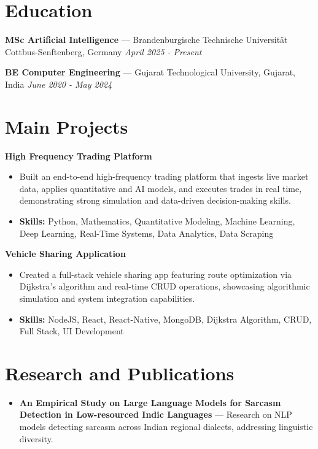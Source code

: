 \documentclass[a4paper,10pt]{article}
\begin{document}
\section*{Education}
\textbf{MSc Artificial Intelligence} — Brandenburgische Technische Universität Cottbus-Senftenberg, Germany \hfill \textit{April 2025 - Present}\par
\vspace{1.5pt}
\textbf{BE Computer Engineering} — Gujarat Technological University, Gujarat, India \hfill \textit{June 2020 - May 2024}\par

\section*{Main Projects}
\textbf{High Frequency Trading Platform}\par
\vspace{1pt}
\begin{itemize}
  \item Built an end-to-end high-frequency trading platform that ingests live market data, applies quantitative and AI models, and executes trades in real time, demonstrating strong simulation and data-driven decision-making skills.
  \item \textbf{Skills:} Python, Mathematics, Quantitative Modeling, Machine Learning, Deep Learning, Real-Time Systems, Data Analytics, Data Scraping
\end{itemize}
\vspace{3pt}
\textbf{Vehicle Sharing Application}\par
\vspace{1pt}
\begin{itemize}
  \item Created a full-stack vehicle sharing app featuring route optimization via Dijkstra's algorithm and real-time CRUD operations, showcasing algorithmic simulation and system integration capabilities.
  \item \textbf{Skills:} NodeJS, React, React-Native, MongoDB, Dijkstra Algorithm, CRUD, Full Stack, UI Development
\end{itemize}

\section*{Research and Publications}
\begin{itemize}
\item \textbf{An Empirical Study on Large Language Models for Sarcasm Detection in Low-resourced Indic Languages} — Research on NLP models detecting sarcasm across Indian regional dialects, addressing linguistic diversity.
\end{itemize}
\end{document}

